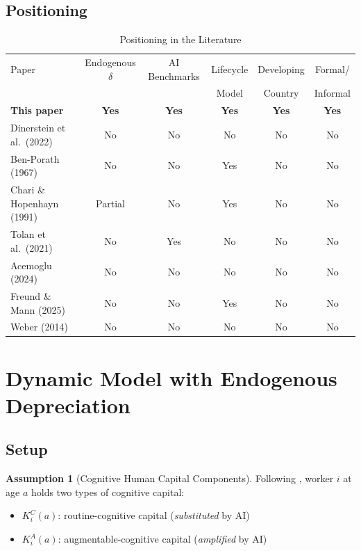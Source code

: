 \documentclass[11pt,a4paper]{article}
\theoremstyle{definition}
\newtheorem{assumption}{Assumption}
\begin{document}
\subsection{Positioning}

\begin{table}[htbp]
\centering
\caption{Positioning in the Literature}
\label{tab:positioning}
\small
\begin{tabular}{lccccc}
\toprule
Paper & Endogenous $\delta$ & AI Benchmarks & Lifecycle & Developing & Formal/ \\
& & & Model & Country & Informal \\
\midrule
\textbf{This paper} & \textbf{Yes} & \textbf{Yes} & \textbf{Yes} & \textbf{Yes} & \textbf{Yes} \\
Dinerstein et al.\ (2022) & No & No & No & No & No \\
Ben-Porath (1967) & No & No & Yes & No & No \\
Chari \& Hopenhayn (1991) & Partial & No & Yes & No & No \\
Tolan et al.\ (2021) & No & Yes & No & No & No \\
Acemoglu (2024) & No & No & No & No & No \\
Freund \& Mann (2025) & No & No & Yes & No & No \\
Weber (2014) & No & No & No & No & No \\
\bottomrule
\end{tabular}
\end{table}


\section{Dynamic Model with Endogenous Depreciation}
\label{sec:model}

\subsection{Setup}

\begin{assumption}[Cognitive Human Capital Components]
Following \citet{espinal2026ahc}, worker $i$ at age $a$ holds two types of cognitive capital:
\begin{itemize}[leftmargin=*]
\item $K_i^C(a)$: routine-cognitive capital (\textit{substituted} by AI)
\item $K_i^A(a)$: augmentable-cognitive capital (\textit{amplified} by AI)
\end{itemize}
\end{assumption}
\end{document}
